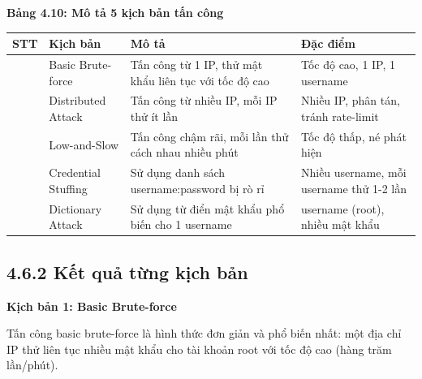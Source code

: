 \documentclass[
  a4paper]{report}
\newcounter{none} %
\begin{document}
\textbf{Bảng 4.10: Mô tả 5 kịch bản tấn công}

{\def\LTcaptype{none} %
\begin{longtable}[]{@{}
  >{\raggedright\arraybackslash}p{}
  >{\raggedright\arraybackslash}p{}
  >{\raggedright\arraybackslash}p{}
  >{\raggedright\arraybackslash}p{}@{}}
\toprule\noalign{}
\begin{minipage}[b]{\linewidth}\raggedright
STT
\end{minipage} & \begin{minipage}[b]{\linewidth}\raggedright
Kịch bản
\end{minipage} & \begin{minipage}[b]{\linewidth}\raggedright
Mô tả
\end{minipage} & \begin{minipage}[b]{\linewidth}\raggedright
Đặc điểm
\end{minipage} \\
\midrule\noalign{}
\endhead
\bottomrule\noalign{}
\endlastfoot
1 & Basic Brute-force & Tấn công từ 1 IP, thử mật khẩu liên tục với tốc
độ cao & Tốc độ cao, 1 IP, 1 username \\
2 & Distributed Attack & Tấn công từ nhiều IP, mỗi IP thử ít lần & Nhiều
IP, phân tán, tránh rate-limit \\
3 & Low-and-Slow & Tấn công chậm rãi, mỗi lần thử cách nhau nhiều phút &
Tốc độ thấp, né phát hiện \\
4 & Credential Stuffing & Sử dụng danh sách username:password bị rò rỉ &
Nhiều username, mỗi username thử 1-2 lần \\
5 & Dictionary Attack & Sử dụng từ điển mật khẩu phổ biến cho 1 username
& 1 username (root), nhiều mật khẩu \\
\end{longtable}
}

\subsection{4.6.2 Kết quả từng kịch
bản}\label{kux1ebft-quux1ea3-tux1eebng-kux1ecbch-bux1ea3n}

\textbf{Kịch bản 1: Basic Brute-force}

Tấn công basic brute-force là hình thức đơn giản và phổ biến nhất: một
địa chỉ IP thử liên tục nhiều mật khẩu cho tài khoản root với tốc độ cao
(hàng trăm lần/phút).
\end{document}
